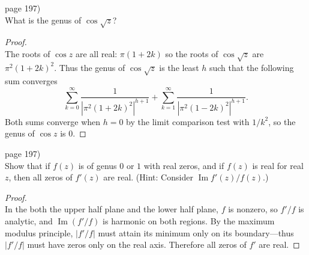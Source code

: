 \documentclass{article}
\newenvironment{problem}[2][Problem]{\begin{trivlist}
\item[\hskip \labelsep {\bfseries #1}\hskip \labelsep {\bfseries #2.}]}{\end{trivlist}}
\begin{document}
\begin{problem}{3} (page 197) \\
  What is the genus of $\cos \sqrt{z}$?
\end{problem}
\begin{proof} \text{} \\
  The roots of $\cos z$ are all real: $\pi(1 + 2k)$ so the roots of
  $\cos \sqrt{z}$ are $\pi^2(1 + 2k)^2$.
  Thus the genus of $\cos \sqrt{z}$ is the least $h$ such that the following sum converges \[
    \sum_{k=0}^\infty \frac{1}{|\pi^2(1 + 2k)^2|^{h+1}} + \sum_{k=1}^\infty \frac{1}{|\pi^2(1 - 2k)^2|^{h+1}}.
  \]
  Both sums converge when $h = 0$ by the limit comparison test with $1/k^2$, so
  the genus of $\cos z$ is $0$.

\end{proof}
\pagebreak

\begin{problem}{5} (page 197) \\
  Show that if $f(z)$ is of genus $0$ or $1$ with real zeros, and if $f(z)$ is
  real for real $z$, then all zeros of $f'(z)$ are real.
  (Hint: Consider $\operatorname{Im} f'(z)/f(z)$.)
\end{problem}
\begin{proof} \text{} \\
  In the both the upper half plane and the lower half plane, $f$ is nonzero,
  so $f'/f$ is analytic, and $\operatorname{Im}(f'/f)$ is harmonic on both
  regions. By the maximum modulus principle, $|f'/f|$ must attain its minimum
  only on its boundary---thus $|f'/f|$ must have zeros only on the real axis.
  Therefore all zeros of $f'$ are real.
\end{proof}
\pagebreak
\end{document}
